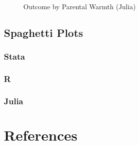 \documentclass[
  letterpaper,
  DIV=11,
  numbers=noendperiod]{scrreprt}
\newlength{\cslhangindent}
\newenvironment{CSLReferences}[2] %
 {\begin{list}{}{%
  \setlength{\itemindent}{0pt}
  \setlength{\leftmargin}{0pt}
  \setlength{\parsep}{0pt}
  \ifodd #1
   \setlength{\leftmargin}{\cslhangindent}
   \setlength{\itemindent}{-1\cslhangindent}
  \fi
  \setlength{\itemsep}{#2\baselineskip}}}
 {\end{list}}
\begin{document}
\begin{figure}[H]


\caption{\label{fig-Julialongitudinal}Outcome by Parental Warmth
(Julia)}

\end{figure}%

\section{Spaghetti Plots}\label{spaghetti-plots}

\subsection{Stata}

\subsection{R}

\subsection{Julia}


\chapter*{References}\label{references}


\label{refs}
\begin{CSLReferences}{0}{1}
\end{CSLReferences}
\end{document}
